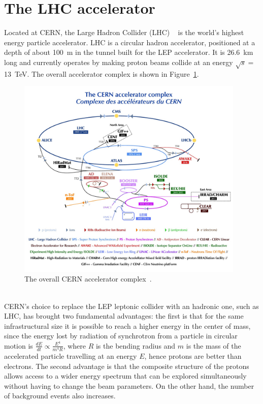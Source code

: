 \section{The LHC accelerator}
Located at CERN, the Large Hadron Collider (LHC) ~\cite{CERN_acc} is the world’s highest energy particle accelerator.
LHC is a circular hadron accelerator, positioned at a depth of about 100~m in the tunnel built for the LEP accelerator.
It is 26.6~km long and currently operates by making proton beams collide at an energy $ \sqrt {s} = $ 13~TeV. 
The overall accelerator complex is shown in Figure~\ref{fig:CERN_complex}.
\begin{figure}[!h]
	\centering
	\includegraphics[width=0.97\textwidth]{Chapters/CH2/figures/CERN_complex}
	\caption{The overall CERN accelerator complex~\cite{CERN_complex}.}
	\label{fig:CERN_complex}
\end{figure}
\\CERN's choice to replace the LEP leptonic collider with an hadronic one, such as LHC, has brought two fundamental advantages: the first is that for the same infrastructural size it is possible to reach a higher energy in the center of mass, since the energy lost by radiation of synchrotron from a particle in circular motion is $\frac{dE}{dt}\propto\frac{E^4}{m^4R}$, where $R$ is the bending radius and $m$ is the mass of the accelerated particle travelling at an energy $E$, hence protons are better than electrons.
\noindent The second advantage is that the composite structure of the protons allows access to a wider energy spectrum that can be explored simultaneously without having to change the beam parameters. On the other hand, the number of background events also increases.
